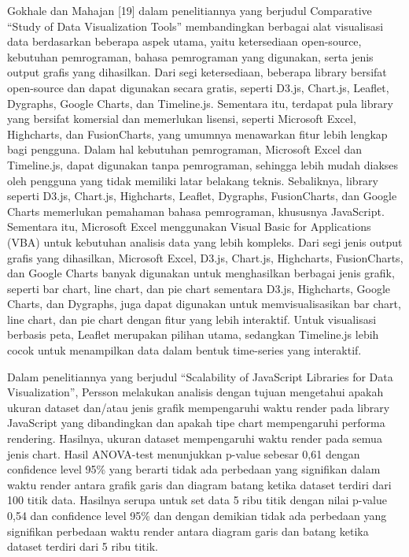Gokhale dan Mahajan [19] dalam penelitiannya yang berjudul Comparative “Study of Data Visualization Tools” membandingkan berbagai alat visualisasi data berdasarkan beberapa aspek utama, yaitu ketersediaan open-source, kebutuhan pemrograman, bahasa pemrograman yang digunakan, serta jenis output grafis yang dihasilkan. Dari segi ketersediaan, beberapa library bersifat open-source dan dapat digunakan secara gratis, seperti D3.js, Chart.js, Leaflet, Dygraphs, Google Charts, dan Timeline.js. Sementara itu, terdapat pula library yang bersifat komersial dan memerlukan lisensi, seperti Microsoft Excel, Highcharts, dan FusionCharts, yang umumnya menawarkan fitur lebih lengkap bagi pengguna. Dalam hal kebutuhan pemrograman, Microsoft Excel dan Timeline.js, dapat digunakan tanpa pemrograman, sehingga lebih mudah diakses oleh pengguna yang tidak memiliki latar belakang teknis. Sebaliknya, library seperti D3.js, Chart.js, Highcharts, Leaflet, Dygraphs, FusionCharts, dan Google Charts memerlukan pemahaman bahasa pemrograman, khususnya JavaScript. Sementara itu, Microsoft Excel menggunakan Visual Basic for Applications (VBA) untuk kebutuhan analisis data yang lebih kompleks. Dari segi jenis output grafis yang dihasilkan, Microsoft Excel, D3.js, Chart.js, Highcharts, FusionCharts, dan Google Charts banyak digunakan untuk menghasilkan berbagai jenis grafik, seperti bar chart, line chart, dan pie chart sementara D3.js, Highcharts, Google Charts, dan Dygraphs, juga dapat digunakan untuk memvisualisasikan bar chart, line chart, dan pie chart dengan fitur yang lebih interaktif. Untuk visualisasi berbasis peta, Leaflet merupakan pilihan utama, sedangkan Timeline.js lebih cocok untuk menampilkan data dalam bentuk time-series yang interaktif.

Dalam penelitiannya yang berjudul “Scalability of JavaScript Libraries for Data Visualization”, Persson \cite{Persson2021} melakukan analisis dengan tujuan mengetahui apakah ukuran dataset dan/atau jenis grafik mempengaruhi waktu render pada library JavaScript yang dibandingkan dan apakah tipe chart mempengaruhi performa rendering. Hasilnya, ukuran dataset mempengaruhi waktu render pada semua jenis chart. Hasil ANOVA-test menunjukkan p-value sebesar 0,61 dengan confidence level 95\% yang berarti tidak ada perbedaan yang signifikan dalam waktu render antara grafik garis dan diagram batang ketika dataset terdiri dari 100 titik data. Hasilnya serupa untuk set data 5 ribu titik dengan nilai p-value 0,54 dan confidence level 95\% dan dengan demikian tidak ada perbedaan yang signifikan perbedaan waktu render antara diagram garis dan batang ketika dataset terdiri dari 5 ribu titik.

